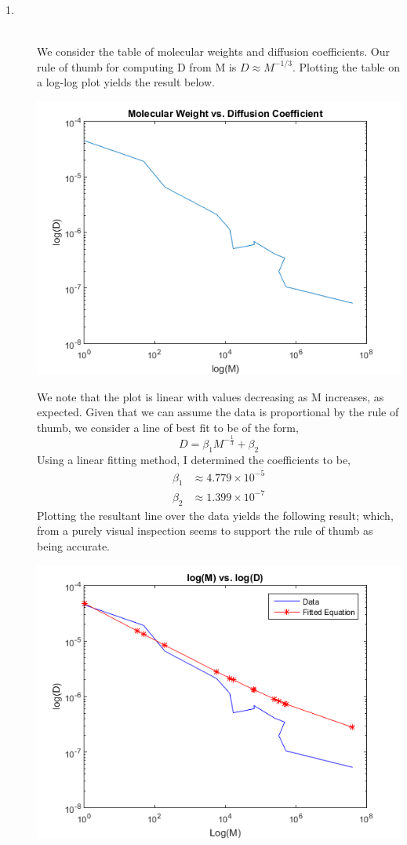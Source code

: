 \documentclass[letterpaper,10pt]{article}
\begin{document}
\begin{description}
\item[1.]\hfill \\
We consider the table of molecular weights and diffusion coefficients. Our rule of thumb for computing D from M is $D\approx M^{-1/3}$. Plotting the table on a log-log plot yields the result below.
\begin{center}
\includegraphics{pureplot.png}
\end{center}
We note that the plot is linear with values decreasing as M increases, as expected. Given that we can assume the data is proportional by the rule of thumb, we consider a line of best fit to be of the form,
\[D=\beta_1M^{-\frac{1}{3}}+\beta_2\]
Using a linear fitting method, I determined the coefficients to be,
\begin{align*}
\beta_1 &\approx 4.779\times 10^{-5}\\
\beta_2 &\approx 1.399\times 10^{-7}
\end{align*}
Plotting the resultant line over the data yields the following result; which, from a purely visual inspection seems to support the rule of thumb as being accurate.
\begin{center}
\includegraphics{bestfit.png}

\end{center}
\end{description}
\end{document}
